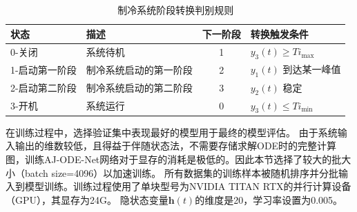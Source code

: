\begin{table}[]
    \centering
    \caption{制冷系统阶段转换判别规则}
    \label{tab:cooling_dfa}
    \begin{tabular}{llcl}
    \toprule
       状态                  &    描述             & 下一阶段 & 转换触发条件                                   \\ 
       \hline
    0-关闭                       & 系统待机                             & 1          & $y_3(t)\geq Ti_{\max}$                                \\
    1-启动第一阶段                      & 制冷系统启动的第一阶段                     & 2          & $y_1(t)$ 到达某一峰值                            \\
    2-启动第二阶段                       & 制冷系统启动的第二阶段 & 3          & \multicolumn{1}{l}{$y_2(t)$ 稳定} \\
    3-开机                       & 系统运行                                   & 0          & $y_3(t)\leq Ti_{\min}$                                \\
    \bottomrule
    \end{tabular}
\end{table}

在训练过程中，选择验证集中表现最好的模型用于最终的模型评估。
由于系统输入输出的维数较低，且得益于伴随状态法，不需要存储求解ODE时的完整计算图，训练AJ-ODE-Net网络对于显存的消耗是极低的。因此本节选择了较大的批大小（batch size=4096）以加速训练。
所有数据集的训练样本被随机排序并分批输入到模型训练。训练过程使用了单块型号为NVIDIA TITAN RTX的并行计算设备（GPU），其显存为24G。
隐状态变量$\boldsymbol h(t)$的维度是20，学习率设置为0.005。





